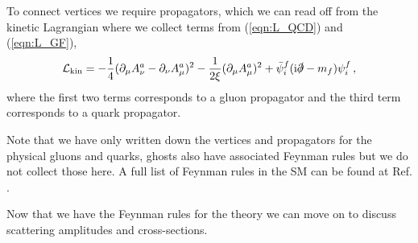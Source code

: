 \documentclass[main.tex]{subfiles}
\begin{document}
    To connect vertices we require propagators, which
    we can read off from the kinetic Lagrangian where
    we collect terms from (\ref{eqn:L_QCD}) and (\ref{eqn:L_GF}), 
    \begin{equation}\label{L_kin}
        \mathcal{L}_{\mathrm{kin}} = -\dfrac{1}{4}(\partial_{\mu}A^{a}_{\nu}-\partial_{\nu}A^{a}_{\mu})^{2} - \dfrac{1}{2\xi}(\partial_{\mu}A^{a}_{\mu})^{2} + \bar{\psi}_{i}^{f}(\mathrm{i}\slashed{\partial}-m_{f})\psi_{i}^{f} \, ,
    \end{equation}
    where the first two terms corresponds to a gluon
    propagator and the third term corresponds to
    a quark propagator.

    Note that we have only written down the vertices
    and propagators for the physical gluons and quarks,
    ghosts also have associated Feynman rules but we do
    not collect those here. A full list of Feynman rules
    in the SM can be found at Ref. \cite{Romao:2012pq}.

    Now that we have the Feynman rules for the theory
    we can move on to discuss scattering amplitudes
    and cross-sections.
\end{document}
